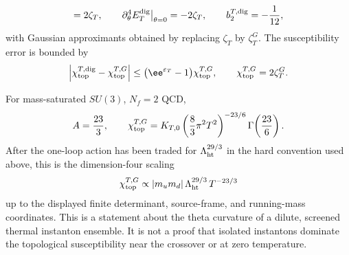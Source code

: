 \begin{controlledapproximation}
\begin{equation}
  =
  2\zeta_T,\qquad
  \partial_\theta^4E_T^{\rm dig}\big|_{\theta=0}
  =
  -2\zeta_T,\qquad
  b_2^{T,{\rm dig}}=-\frac1{12},
  \label{eq:thermal-dilute-topological-cumulants}
\end{equation}
with Gaussian approximants obtained by replacing \(\zeta_T\) by
\(\zeta_T^G\).  The susceptibility error is bounded by
\begin{equation}
  \left|
  \chi_{\rm top}^{T,{\rm dig}}-\chi_{\rm top}^{T,G}
  \right|
  \le
  \bigl(\ee^{\varepsilon_T}-1\bigr)\chi_{\rm top}^{T,G},
  \qquad
  \chi_{\rm top}^{T,G}=2\zeta_T^{G}.
  \label{eq:thermal-dilute-susceptibility-residual}
\end{equation}

For mass-saturated \(SU(3)\), \(N_f=2\) QCD,
\[
  A=\frac{23}{3},\qquad
  \chi_{\rm top}^{T,G}
  =
  K_{T,0}
  \left(\frac83\pi^2T^2\right)^{-23/6}
  \Gamma\!\left(\frac{23}{6}\right).
\]
After the one-loop action has been traded for
\(\Lambda_{\rm ht}^{29/3}\) in the hard convention used above, this is the
dimension-four scaling
\begin{equation}
  \chi_{\rm top}^{T,G}
  \propto
  |m_u m_d|\,
  \Lambda_{\rm ht}^{29/3}\,
  T^{-23/3}
  \label{eq:thermal-su3-nf2-topological-susceptibility-scaling}
\end{equation}
up to the displayed finite determinant, source-frame, and running-mass
coordinates.  This is a statement about the theta curvature of a dilute,
screened thermal instanton ensemble.  It is not a proof that isolated
instantons dominate the topological susceptibility near the crossover or at
zero temperature.
\end{controlledapproximation}

